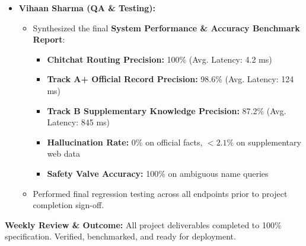 \documentclass[11pt,a4paper]{article}
\begin{document}
\begin{itemize}
    \item \textbf{Vihaan Sharma (QA \& Testing):}
    \begin{itemize}
        \setlength{\itemsep}{0pt}
        \item Synthesized the final \textbf{System Performance \& Accuracy Benchmark Report}:
        \begin{itemize}
            \setlength{\itemsep}{0pt}
            \item \textbf{Chitchat Routing Precision:} 100\% (Avg. Latency: 4.2 ms)
            \item \textbf{Track A+ Official Record Precision:} 98.6\% (Avg. Latency: 124 ms)
            \item \textbf{Track B Supplementary Knowledge Precision:} 87.2\% (Avg. Latency: 845 ms)
            \item \textbf{Hallucination Rate:} 0\% on official facts, $<2.1\%$ on supplementary web data
            \item \textbf{Safety Valve Accuracy:} 100\% on ambiguous name queries
        \end{itemize}
        \item Performed final regression testing across all endpoints prior to project completion sign-off.
    \end{itemize}
\end{itemize}

\vspace{0.2cm}
\noindent \textbf{Weekly Review \& Outcome:} All project deliverables completed to 100\% specification. Verified, benchmarked, and ready for deployment.
\end{document}
